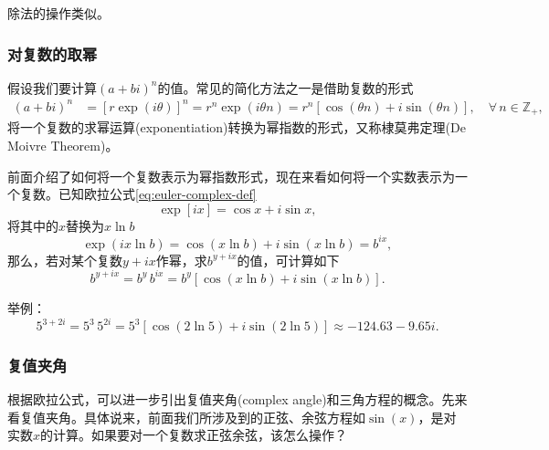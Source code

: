 \begin{subappendices}
除法的操作类似。

\subsubsection{对复数的取幂}
\label{sec:euler-complex-exponentiation}

假设我们要计算$\left( a+bi \right)^{n}$的值。常见的简化方法之一是借助复数的形式
\begin{equation}
  \label{eq:euler-complex-exponentiation}
  \begin{split}
    \left( a+bi \right)^{n} & = \left[ r \exp
    \left(
    i \theta
    \right)
    \right]^{n}
    = r^{n} \exp \left( i \theta n \right)
    = r^{n} \left[ \cos \left( \theta n \right) + i \sin \left( \theta n \right) \right], \quad \forall \, n \in \mathbb{Z}_{+},
  \end{split}
\end{equation}
将一个复数的求幂运算(exponentiation)转换为幂指数的形式，又称棣莫弗定理(De Moivre Theorem)。

前面介绍了如何将一个复数表示为幂指数形式，现在来看如何将一个实数表示为一个复数。已知欧拉公式\eqref{eq:euler-complex-def}
\begin{equation*}
  \exp \left[ i x \right] = \cos x + i \sin x,
\end{equation*}
将其中的$x$替换为$x \ln b$
\begin{equation*}
  \exp \left( i x \ln b \right) = \cos \left( x \ln b \right) + i \sin \left( x \ln b \right) = b^{i x},
\end{equation*}
那么，若对某个复数$y+ix$作幂，求$b^{y+ix}$的值，可计算如下
\begin{equation}
  \label{eq:euler-complex-exponentiation-xyi}
  b^{y+ix} = b^{y} \, b^{ix} = b^{y}
  \left[
  \cos \left( x \ln b \right) + i \sin \left( x \ln b \right)
  \right].
\end{equation}

举例：
\begin{equation*}
  5^{3+2i} = 5^{3} \, 5^{2i} = 5^{3} \left[ \cos \left( 2 \ln 5 \right) + i \sin \left( 2 \ln 5 \right) \right] \approx - 124.63 - 9.65 i.
\end{equation*}

\subsubsection{复值夹角}
\label{sec:euler-complex-angle-conjugate}
根据欧拉公式，可以进一步引出复值夹角(complex angle)和三角方程的概念。先来看复值夹角。具体说来，前面我们所涉及到的正弦、余弦方程如$\sin(x)$，是对实数$x$的计算。如果要对一个复数求正弦余弦，该怎么操作？


\end{subappendices}
